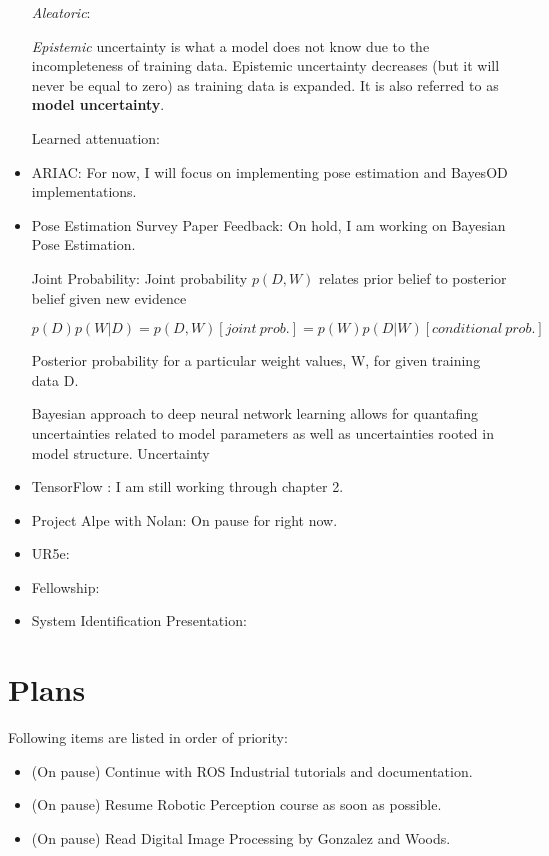 \documentclass[11pt]{article}
\begin{document}
\begin{itemize}
	\textit{Aleatoric}:
	
	\textit{Epistemic} uncertainty is what a model does not know due to the 
	incompleteness of training data. Epistemic uncertainty decreases (but it 
	will never be equal to zero) as training data is expanded. It is also 
	referred to as \textbf{model uncertainty}.
	
	Learned attenuation: 
	
	
	
	\item ARIAC: For now, I will focus on implementing pose estimation and BayesOD implementations.
	
	\item Pose Estimation Survey Paper Feedback: On hold, I am working on
	Bayesian Pose Estimation.

Joint Probability: Joint probability \(p(D,W)\) relates prior belief to 
posterior belief given new evidence 

\( p(D)p(W|D) = p(D,W) [joint~prob.] = p(W)p(D|W) [conditional~prob.] \)

Posterior probability for a particular weight values, W, for given training data D. 

Bayesian approach to deep neural network learning allows for quantafing 
uncertainties related to model parameters as well as uncertainties rooted in 
model structure. Uncertainty 


	\item TensorFlow \cite{CVTF2}: I am still working through chapter 2. 


	\item Project Alpe with Nolan: On pause for right now. 
	\item UR5e: 
	\item Fellowship:
	\item System Identification Presentation:



\end{itemize}


\section{Plans}
Following items are listed in order of priority:

\begin{itemize}

	\item (On pause) Continue with ROS Industrial tutorials and documentation.

	\item (On pause) Resume Robotic Perception course as soon as possible.

	\item (On pause) Read Digital Image Processing by Gonzalez and Woods.

\end{itemize}



\newpage


\end{document}
